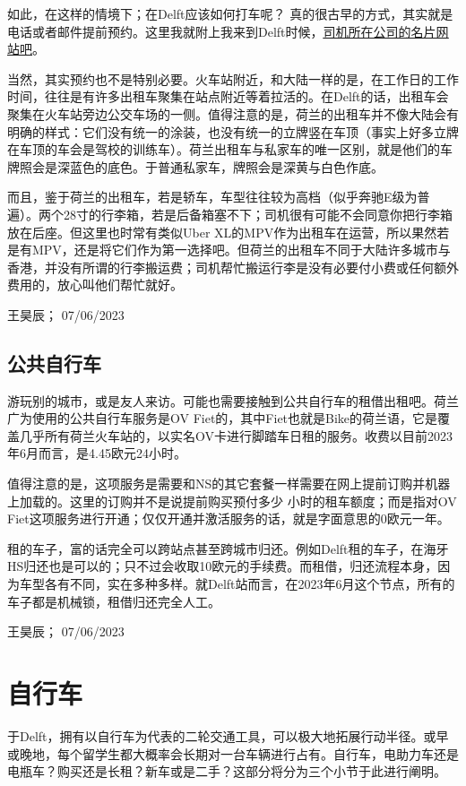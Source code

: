 如此，在这样的情境下；在Delft应该如何打车呢？ 真的很古早的方式，其实就是电话或者邮件提前预约。这里我就附上我来到Delft时候，\href{https://taxidelfland.nl/}{\uline{司机所在公司的名片网站吧}}。

当然，其实预约也不是特别必要。火车站附近，和大陆一样的是，在工作日的工作时间，往往是有许多出租车聚集在站点附近等着拉活的。在Delft的话，出租车会聚集在火车站旁边公交车场的一侧。值得注意的是，荷兰的出租车并不像大陆会有明确的样式：它们没有统一的涂装，也没有统一的立牌竖在车顶（事实上好多立牌在车顶的车会是驾校的训练车）。荷兰出租车与私家车的唯一区别，就是他们的车牌照会是深蓝色的底色。于普通私家车，牌照会是深黄与白色作底。

而且，鉴于荷兰的出租车，若是轿车，车型往往较为高档（似乎奔驰E级为普遍）。两个28寸的行李箱，若是后备箱塞不下；司机很有可能不会同意你把行李箱放在后座。但这里也时常有类似Uber XL的MPV作为出租车在运营，所以果然若是有MPV，还是将它们作为第一选择吧。但荷兰的出租车不同于大陆许多城市与香港，并没有所谓的行李搬运费；司机帮忙搬运行李是没有必要付小费或任何额外费用的，放心叫他们帮忙就好。
\begin{flushright}
王昊辰； 07/06/2023
\end{flushright}

\subsection{公共自行车}
游玩别的城市，或是友人来访。可能也需要接触到公共自行车的租借出租吧。荷兰广为使用的公共自行车服务是OV Fiet的，其中Fiet也就是Bike的荷兰语，它是覆盖几乎所有荷兰火车站的，以实名OV卡进行脚踏车日租的服务。收费以目前2023年6月而言，是4.45欧元24小时。

值得注意的是，这项服务是需要和NS的其它套餐一样需要在网上提前订购并机器上加载的。这里的订购并不是说提前购买预付多少
小时的租车额度；而是指对OV Fiet这项服务进行开通；仅仅开通并激活服务的话，就是字面意思的0欧元一年。

租的车子，富的话完全可以跨站点甚至跨城市归还。例如Delft租的车子，在海牙HS归还也是可以的；只不过会收取10欧元的手续费。而租借，归还流程本身，因为车型各有不同，实在多种多样。就Delft站而言，在2023年6月这个节点，所有的车子都是机械锁，租借归还完全人工。
\begin{flushright}
王昊辰； 07/06/2023
\end{flushright}
\vspace{\betsubsec} %
\section{自行车}
于Delft，拥有以自行车为代表的二轮交通工具，可以极大地拓展行动半径。或早或晚地，每个留学生都大概率会长期对一台车辆进行占有。自行车，电助力车还是电瓶车？购买还是长租？新车或是二手？这部分将分为三个小节于此进行阐明。

